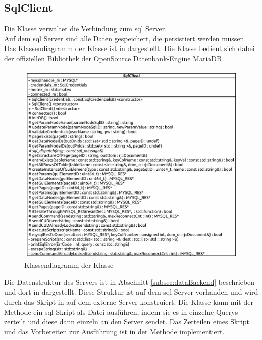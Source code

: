 \subsection{SqlClient}
Die  Klasse verwaltet die Verbindung zum \ac{sql} Server. \\Auf dem \ac{sql} Server sind alle Daten gespeichert, die persistiert werden müssen. 
Das Klassendiagramm der  Klasse ist in  dargestellt.
Die Klasse bedient sich dabei der offiziellen Bibliothek  der OpenSource Datenbank-Engine MariaDB \citep{mariaDB}.
\begin{figure}[ht]
  \centering
  \includegraphics[width=\textwidth]{content/hauptteil/umsetzungPoC/backend/uml/classesOfOverview/SqlClient.pdf}
  \caption{Klassendiagramm der Klasse }
  \label{fig:backend:classDiag:SqlClient}
\end{figure}
Die Datenstruktur des Servers ist in Abschnitt \ref{subsec:dataBackend} beschrieben und dort in  dargestellt.
Diese Struktur ist auf dem \ac{sql} Server vorhanden und wird durch das Skript in  auf dem externe Server konstruiert.
Die  Klasse kann mit der Methode  ein \ac{sql} Skript als Datei ausführen, indem sie es in einzelne Querys zerteilt und diese dann einzeln an den Server sendet.
Das Zerteilen eines Skript und das Vorbereiten zur Ausführung ist in der Methode  implementiert. 
